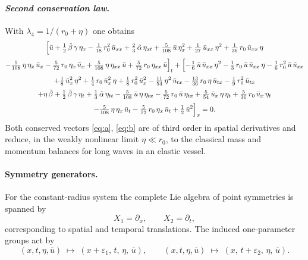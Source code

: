 \documentclass[alpha-refs, 12pt]{wiley-article}
\begin{document}
\paragraph{\textit{Second conservation law}.} With $\displaystyle\lambda_{4}=1/(r_{0}+\eta)$ one obtains
\begin{multline}\label{eq:b}
  \Bigl[
        \bar{u}
        +\tfrac12\,\tilde{\beta}\,\gamma\,\eta_{x}
        -\tfrac1{18}\,r_{0}^{2}\,\bar{u}_{xx}
        +\tfrac23\,\tilde{\alpha}\,\eta_{xt}
        +\tfrac{5}{108}\,\bar{u}\,\eta_{x}^{2}
        +\tfrac1{27}\,\bar{u}_{xx}\,\eta^{2}
        +\tfrac1{36}\,r_{0}\,\bar{u}_{xx}\,\eta
        \\[2pt]
        -\tfrac{5}{108}\,\eta\,\eta_{x}\,\bar{u}_{x}
        -\tfrac{5}{72}\,r_{0}\,\eta_{x}\,\bar{u}_{x}
        +\tfrac{5}{108}\,\eta\,\eta_{xx}\,\bar{u}
        +\tfrac{5}{72}\,r_{0}\,\eta_{xx}\,\bar{u}
  \Bigr]_{t}
  +\Bigl[
        -\tfrac16\,\bar{u}\,\bar{u}_{xx}\,\eta^{2}
        -\tfrac13\,r_{0}\,\bar{u}\,\bar{u}_{xx}\,\eta
        -\tfrac16\,r_{0}^{2}\,\bar{u}\,\bar{u}_{xx}
        \\[2pt]
        +\tfrac18\,\bar{u}_{x}^{2}\,\eta^{2}
        +\tfrac14\,r_{0}\,\bar{u}_{x}^{2}\,\eta
        +\tfrac18\,r_{0}^{2}\,\bar{u}_{x}^{2}
        -\tfrac{11}{54}\,\eta^{2}\,\bar{u}_{tx}
        -\tfrac{13}{36}\,r_{0}\,\eta\,\bar{u}_{tx}
        -\tfrac19\,r_{0}^{2}\,\bar{u}_{tx}
        \\[2pt]
        +\eta\,\tilde{\beta}
        +\tfrac12\,\tilde{\beta}\,\gamma\,\eta_{t}
        +\tfrac13\,\tilde{\alpha}\,\eta_{tt}
        -\tfrac{5}{108}\,\bar{u}\,\eta\,\eta_{tx}
        -\tfrac{5}{72}\,r_{0}\,\bar{u}\,\eta_{tx}
        +\tfrac{5}{54}\,\bar{u}_{x}\,\eta\,\eta_{t}
        +\tfrac{5}{36}\,r_{0}\,\bar{u}_{x}\,\eta_{t}
        \\[2pt]
        -\tfrac{5}{108}\,\eta\,\eta_{x}\,\bar{u}_{t}
        -\tfrac{5}{72}\,r_{0}\,\eta_{x}\,\bar{u}_{t}
        +\tfrac12\,\bar{u}^{2}
  \Bigr]_{x}=0.
\end{multline}
Both conserved vectors \eqref{eq:a}, \eqref{eq:b} are of third order in spatial derivatives and reduce, in the weakly nonlinear limit $\eta \ll r_{0}$, to the classical mass and momentum balances for long waves in an elastic vessel.

\paragraph{Symmetry generators.} For the constant-radius system the complete Lie algebra of point symmetries is spanned by
\[
  X_{1}=\partial_{x},
  \qquad
  X_{2}=\partial_{t},
\]
corresponding to spatial and temporal translations. The induced one-parameter groups act by
\[
  (x,t,\eta,\bar{u})\;\mapsto\;
  (x+\varepsilon_{1},\,t,\,\eta,\,\bar{u}),
  \qquad
  (x,t,\eta,\bar{u})\;\mapsto\;
  (x,\,t+\varepsilon_{2},\,\eta,\,\bar{u}).
\]
\end{document}
